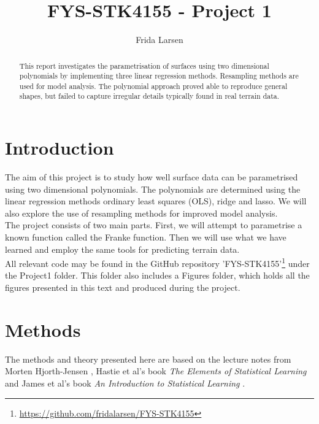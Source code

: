 \documentclass[notitlepage, reprint, nofootinbib]{revtex4-1}
\begin{document}
\title{FYS-STK4155 - Project 1}
\author{Frida Larsen}

\begin{abstract}
This report investigates the parametrisation of surfaces using two dimensional polynomials by implementing three linear regression methods. Resampling methods are used for model analysis. The polynomial approach proved able to reproduce general shapes, but failed to capture irregular details typically found in real terrain data. 
\end{abstract}

\maketitle

\section{Introduction}
The aim of this project is to study how well surface data can be parametrised using two dimensional polynomials. The polynomials are determined using the linear regression methods ordinary least squares (OLS), ridge and lasso. We will also explore the use of resampling methods for improved model analysis. \\[2mm]
The project consists of two main parts. First, we will attempt to parametrise a known function called the Franke function. Then we will use what we have learned and employ the same tools for predicting terrain data. \\[2mm]
All relevant code may be found in the GitHub repository 'FYS-STK4155'\footnote{\href{GitHub Repository}{https://github.com/fridalarsen/FYS-STK4155}} under the Project1 folder. This folder also includes a Figures folder, which holds all the figures presented in this text and produced during the project.

\section{Methods}
The methods and theory presented here are based on the lecture notes from Morten Hjorth-Jensen \cite{lecturenotes1}\cite{lecturenotes2}, Hastie et al's book \emph{The Elements of Statistical Learning} \cite{ESL} and James et al's book \emph{An Introduction to Statistical Learning} \cite{ISL}.  
\end{document}

